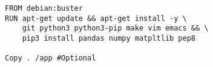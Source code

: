 
\begin{lstlisting}[language=docker, frame=single, caption={Python DevContainer Dockerfile},label=code::docker_dev_example]
FROM debian:buster
RUN apt-get update && apt-get install -y \
    git python3 python3-pip make vim emacs && \
    pip3 install pandas numpy matpltlib pep8

Copy . /app #Optional
\end{lstlisting}
